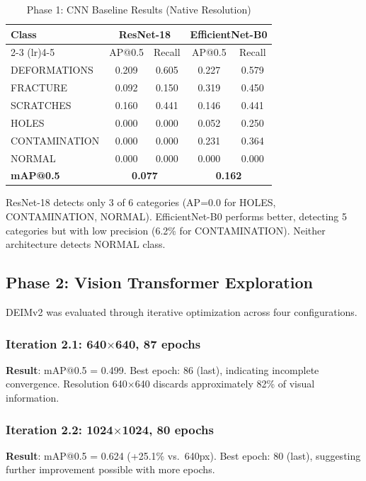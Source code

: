 \documentclass[journal,twoside,web]{ieeecolor}
\begin{document}
\begin{table}[htbp]
\centering
\caption{Phase 1: CNN Baseline Results (Native Resolution)}
\label{tab:phase1}
\begin{tabular}{lcccc}
\toprule
\textbf{Class} & \multicolumn{2}{c}{\textbf{ResNet-18}} & \multicolumn{2}{c}{\textbf{EfficientNet-B0}} \\
\cmidrule(lr){2-3} \cmidrule(lr){4-5}
 & AP@0.5 & Recall & AP@0.5 & Recall \\
\midrule
DEFORMATIONS & 0.209 & 0.605 & 0.227 & 0.579 \\
FRACTURE & 0.092 & 0.150 & 0.319 & 0.450 \\
SCRATCHES & 0.160 & 0.441 & 0.146 & 0.441 \\
HOLES & 0.000 & 0.000 & 0.052 & 0.250 \\
CONTAMINATION & 0.000 & 0.000 & 0.231 & 0.364 \\
NORMAL & 0.000 & 0.000 & 0.000 & 0.000 \\
\midrule
\textbf{mAP@0.5} & \multicolumn{2}{c}{\textbf{0.077}} & \multicolumn{2}{c}{\textbf{0.162}} \\
\bottomrule
\end{tabular}
\end{table}

ResNet-18 detects only 3 of 6 categories (AP=0.0 for HOLES, CONTAMINATION, NORMAL). EfficientNet-B0 performs better, detecting 5 categories but with low precision (6.2\% for CONTAMINATION). Neither architecture detects NORMAL class.

\subsection{Phase 2: Vision Transformer Exploration}

DEIMv2 was evaluated through iterative optimization across four configurations.

\subsubsection{Iteration 2.1: 640$\times$640, 87 epochs}
\textbf{Result}: mAP@0.5 = 0.499. Best epoch: 86 (last), indicating incomplete convergence. Resolution 640$\times$640 discards approximately 82\% of visual information.

\subsubsection{Iteration 2.2: 1024$\times$1024, 80 epochs}
\textbf{Result}: mAP@0.5 = 0.624 (+25.1\% vs.\ 640px). Best epoch: 80 (last), suggesting further improvement possible with more epochs.
\end{document}
